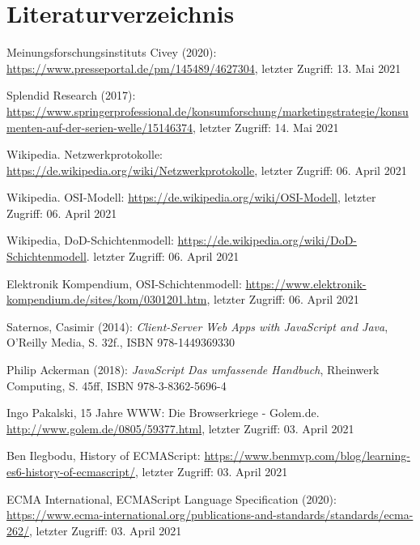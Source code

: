 \documentclass[11pt,a4paper]{article}
\begin{document}
\section*{Literaturverzeichnis}
\begin{itemize}

 Meinungsforschungsinstituts Civey (2020):  \url{https://www.presseportal.de/pm/145489/4627304}, letzter Zugriff: 13. Mai 2021

 Splendid Research (2017): \url{https://www.springerprofessional.de/konsumforschung/marketingstrategie/konsumenten-auf-der-serien-welle/15146374}, letzter Zugriff: 14. Mai 2021



%
%
%
%

 Wikipedia. Netzwerkprotokolle: \url{https://de.wikipedia.org/wiki/Netzwerkprotokolle}, letzter Zugriff: 06. April 2021

  Wikipedia. OSI-Modell: \url{https://de.wikipedia.org/wiki/OSI-Modell}, letzter Zugriff: 06. April 2021

 Wikipedia, DoD-Schichtenmodell: \url{https://de.wikipedia.org/wiki/DoD-Schichtenmodell}. letzter Zugriff: 06. April 2021

 Elektronik Kompendium, OSI-Schichtenmodell: \url{https://www.elektronik-kompendium.de/sites/kom/0301201.htm}, letzter Zugriff: 06. April 2021

%
%
%
%

 Saternos, Casimir (2014): \textit{Client-Server Web Apps with JavaScript and Java}, O'Reilly Media,  S. 32f., ISBN 978-1449369330

 Philip Ackerman (2018): \textit{JavaScript Das umfassende Handbuch}, Rheinwerk Computing, S. 45ff, ISBN 978-3-8362-5696-4

 Ingo Pakalski, 15 Jahre WWW: Die Browserkriege - Golem.de. \url{http://www.golem.de/0805/59377.html}, letzter Zugriff: 03. April 2021

 Ben Ilegbodu, History of ECMAScript: \url{https://www.benmvp.com/blog/learning-es6-history-of-ecmascript/}, letzter Zugriff: 03. April 2021

 ECMA International, ECMAScript Language Specification (2020): \url{https://www.ecma-international.org/publications-and-standards/standards/ecma-262/}, letzter Zugriff: 03. April 2021


\end{itemize}
\end{document}
